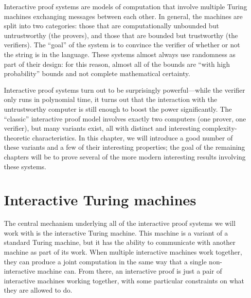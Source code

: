 \documentclass[english,12pt]{reedthesis}
\theoremstyle{plain}
\theoremstyle{definition}
\theoremstyle{remark}
\begin{document}
Interactive proof systems are models of computation that involve multiple Turing
machines exchanging messages between each other. In general, the machines are
split into two categories: those that are computationally unbounded but
untrustworthy (the provers), and those that are bounded but trustworthy (the
verifiers). The ``goal'' of the system is to convince the verifier of whether or
not the string is in the language. These systems almost always use randomness as
part of their design: for this reason, almost all of the bounds are ``with high
probability'' bounds and not complete mathematical certainty.

Interactive proof systems turn out to be surprisingly powerful---while the
verifier only runs in polynomial time, it turns out that the interaction with
the untrustworthy computer is still enough to boost the power significantly. The
``classic'' interactive proof model involves exactly two computers (one prover,
one verifier), but many variants exist, all with distinct and interesting
complexity-theoretic characteristics. In this chapter, we will introduce a good
number of these variants and a few of their interesting properties; the goal of
the remaining chapters will be to prove several of the more modern interesting
results involving these systems.

\section{Interactive Turing machines}\label{sec:interactive-tm}

The central mechanism underlying all of the interactive proof systems we will
work with is the interactive Turing machine. This machine is a variant of a
standard Turing machine, but it has the ability to communicate with another
machine as part of its work. When multiple interactive machines work together,
they can produce a joint computation in the same way that a single
non-interactive machine can. From there, an interactive proof is just a pair of
interactive machines working together, with some particular constraints on what
they are allowed to do.
\end{document}
